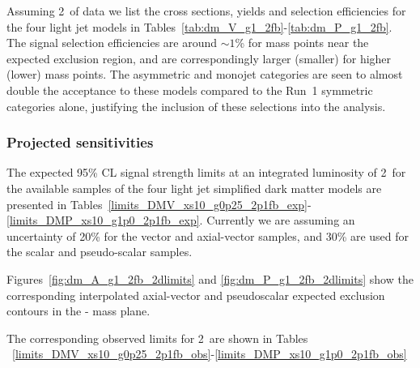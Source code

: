 Assuming 2~\ifb of data we list the cross sections, yields and selection 
efficiencies for the four light jet models in
Tables~\ref{tab:dm_V_g1_2fb}-\ref{tab:dm_P_g1_2fb}. The signal selection
efficiencies are around $\sim 1$\% for mass points near the expected exclusion
region, and are correspondingly larger (smaller) for higher (lower) mass points.
The asymmetric and monojet categories are seen to almost double the acceptance
to these models compared to the Run~1 symmetric categories alone, justifying the
inclusion of these selections into the analysis.

\clearpage 
 \clearpage
 \clearpage
 \clearpage
 \clearpage


\subsubsection{Projected sensitivities}

The expected 95\% CL signal strength limits at an integrated luminosity of 2~\ifb for
the available samples of the four light jet simplified dark matter models are
presented in
Tables~\ref{limits_DMV_xs10_g0p25_2p1fb_exp}-\ref{limits_DMP_xs10_g1p0_2p1fb_exp}.
Currently we are assuming an uncertainty of 20\% for the vector and axial-vector samples, and 30\% are used 
for the scalar and pseudo-scalar samples.


Figures~\ref{fig:dm_A_g1_2fb_2dlimits} and \ref{fig:dm_P_g1_2fb_2dlimits} show
the corresponding interpolated axial-vector and pseudoscalar expected exclusion 
contours in the {\mphi-\mchi} mass plane.



\clearpage
%
% 
%
%


 
 
 

\clearpage
The corresponding observed limits for 2~\ifb are shown in Tables
~\ref{limits_DMV_xs10_g0p25_2p1fb_obs}-\ref{limits_DMP_xs10_g1p0_2p1fb_obs}


